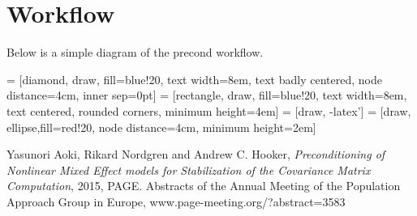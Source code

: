\section{Workflow}

Below is a simple diagram of the precond workflow.

 = [diamond, draw, fill=blue!20, 
    text width=8em, text badly centered, node distance=4cm, inner sep=0pt]
 = [rectangle, draw, fill=blue!20, 
    text width=8em, text centered, rounded corners, minimum height=4em]
 = [draw, -latex']
 = [draw, ellipse,fill=red!20, node distance=4cm,
    minimum height=2em]
    


\begin{thebibliography}{99}
     Yasunori Aoki, Rikard Nordgren and Andrew C. Hooker, {\em Preconditioning of Nonlinear Mixed Effect models for Stabilization of the Covariance Matrix Computation}, 2015, PAGE. Abstracts of the Annual Meeting of the Population Approach Group in Europe, \mbox{www.page-meeting.org/?abstract=3583} 
\end{thebibliography}



